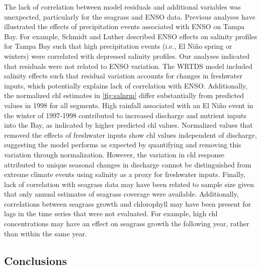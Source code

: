 \documentclass{svjour3}\usepackage[]{graphicx}\usepackage[]{color}
\begin{document}
The lack of correlation between model residuals and additional variables was unexpected, particularly for the seagrass and \ac{ENSO} data.  Previous analyses have illustrated the effects of precipitation events associated with \ac{ENSO} on Tampa Bay.  For example, Schmidt and Luther \cite{Schmidt02} described \ac{ENSO} effects on salinity profiles for Tampa Bay such that high precipitation events (i.e., El Ni\~{n}o spring or winters) were correlated with depressed salinity profiles.  Our analyses indicated that residuals were not related to \ac{ENSO} variation.  The \ac{WRTDS} model included salinity effects such that residual variation accounts for changes in freshwater inputs, which potentially explains lack of correlation with \ac{ENSO}. Additionally, the normalized \ac{chl} estimates in \cref{fig:salnrm} differ substantially from predicted values in 1998 for all segments.  High rainfall associated with an El Ni\~{n}o event in the winter of 1997-1998 contributed to increased discharge and nutrient inputs into the Bay, as indicated by higher predicted \ac{chl} values.  Normalized values that removed the effects of freshwater inputs show \ac{chl} values independent of discharge, suggesting the model performs as expected by quantifying and removing this variation through normalization.  However, the variation in \ac{chl} response attributed to unique seasonal changes in discharge cannot be distinguished from extreme climate events using salinity as a proxy for freshwater inputs.  Finally, lack of correlation with seagrass data may have been related to sample size given that only annual estimates of seagrass coverage were available.  Additionally, correlations between seagrass growth and chlorophyll may have been present for lags in the time series that were not evaluated.  For example, high \ac{chl} concentrations may have an effect on seagrass growth the following year, rather than within the same year.

\subsection{Conclusions}
\end{document}
